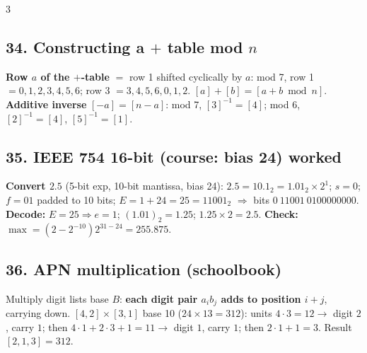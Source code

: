 \documentclass[9pt]{extarticle}
\newcommand{\hl}[1]{\textbf{\textcolor{BrickRed}{#1}}}
\begin{document}
\begin{multicols}{3}
\subsection{34. Constructing a $+$ table mod $n$}
\begin{sloppypar}\raggedright
\textbf{Row $a$ of the $+$-table} $=$ row 1 shifted cyclically by $a$: mod 7, row 1 $=0,1,2,3,4,5,6$; row 3 $=3,4,5,6,0,1,2$. $[a]+[b]=[a{+}b\bmod n]$. \hl{Additive inverse} $[-a]=[n-a]$: mod 7, $[3]^{-1}{=}[4]$; mod 6, $[2]^{-1}{=}[4]$, $[5]^{-1}{=}[1]$.
\end{sloppypar}

\subsection{35. IEEE 754 16-bit (course: bias 24) worked}
\begin{sloppypar}\raggedright
\textbf{Convert $2.5$} (5-bit exp, 10-bit mantissa, bias 24): $2.5{=}10.1_2{=}1.01_2{\times}2^1$; $s{=}0$; $f{=}01$ padded to 10 bits; $E{=}1{+}24{=}25{=}11001_2$ $\Rightarrow$ bits $0\ 11001\ 0100000000$.\\
\textbf{Decode:} $E{=}25\Rightarrow e{=}1$; $(1.01)_2{=}1.25$; $1.25{\times}2{=}2.5$. \hl{Check:} $\max{=}(2{-}2^{-10})2^{31-24}{=}255.875$.
\end{sloppypar}

\subsection{36. APN multiplication (schoolbook)}
\begin{sloppypar}\raggedright
Multiply digit lists base $B$: \hl{each digit pair $a_i b_j$ adds to position $i{+}j$}, carrying down. $[4,2]\times[3,1]$ base 10 ($24{\times}13{=}312$): units $4{\cdot}3{=}12\to$ digit $2$, carry $1$; then $4{\cdot}1{+}2{\cdot}3{+}1{=}11\to$ digit $1$, carry $1$; then $2{\cdot}1{+}1{=}3$. Result $[2,1,3]{=}312$.
\end{sloppypar}

\end{multicols}
\end{document}
